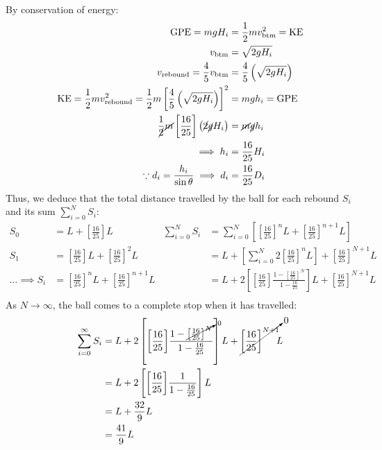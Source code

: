 \documentclass[answers]{exam}
\begin{document}
\begin{questions}
{\begin{solutionorbox}[170mm]
		By conservation of energy:
		\begin{align*}
			\text{GPE} = mgH_{i} &= \frac{1}{2}mv_{\text{btm}}^2 = \text{KE}\\
			v_{\text{btm}} &= \sqrt{2gH_{i}} \\
			v_{\text{rebound}} = \frac{4}{5}v_{\text{btm}} &= \frac{4}{5}\left(\sqrt{2gH_{i}}\right)\\ 
			\text{KE} = \frac{1}{2}mv_{\text{rebound}}^2 = \frac{1}{2}m  \left[\frac{4}{5}\left(\sqrt{2gH_{i}}\right)\right]^2 &= mgh_i = \text{GPE} \\
			\frac{1}{\cancel{2}} \cancel{m} \left[\frac{16}{25}\right]\left(\cancel{2}\cancel{g}H_{i}\right) &= \cancel{m}\cancel{g}h_i \\
			\implies h_i &= \frac{16}{25}H_{i} \\
			\because d_i = \frac{h_i}{\sin\theta} \implies d_i &= \frac{16}{25}D_{i}
		\end{align*}
		Thus, we deduce that the total distance travelled by the ball for each rebound $S_i$ and its sum $\sum_{i = 0}^{N} S_i$:	
		\begin{align*}
			S_0 &= L + \left[\frac{16}{25}\right]L &\sum_{i = 0}^{N} S_i &= \sum_{i = 0}^{N} \left[\left[\frac{16}{25}\right]^{n}\!\!L + \left[\frac{16}{25}\right]^{n+1}\!\!L\right]\\
			S_1 &= \left[\frac{16}{25}\right]L + \left[\frac{16}{25}\right]^2\!\!L &&= L + \left[\sum_{i = 0}^{N}2\left[\frac{16}{25}\right]^{n}\!\!L\right] + \left[\frac{16}{25}\right]^{N+1}\!\!L\\
			\dots \implies S_i &= \left[\frac{16}{25}\right]^{n}\!\!L + \left[\frac{16}{25}\right]^{n+1}\!\!L&&= L + 2\left[\left[\frac{16}{25}\right]\!\frac{1-\left[\frac{16}{25}\right]^N}{1-\frac{16}{25}}\right]L + \left[\frac{16}{25}\right]^{N+1}\!\!L\\
		\end{align*}
		As $N \to \infty$, the ball comes to a complete stop when it has travelled:
		\begin{align*}
			\sum_{i = 0}^{\infty} S_i &= L +2\left[\left[\frac{16}{25}\right]\!\frac{1-\cancelto{0}{\left[\frac{16}{25}\right]^N}}{1-\frac{16}{25}}\right]L + \cancelto{0}{\left[\frac{16}{25}\right]^{N+1}}\!\!L \\
			&=  L +2\left[\left[\frac{16}{25}\right]\!\frac{1}{1-\frac{16}{25}}\right]L \\
			&= L + \frac{32}{9}L \\
			&= \frac{41}{9}L
		\end{align*}
		

\end{solutionorbox}}
\end{questions}
\end{document}
